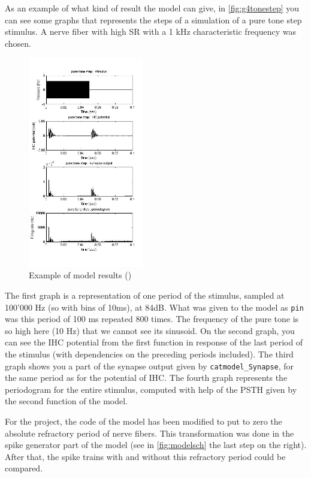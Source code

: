 As an example of what kind of result the model can give,
in \autoref{fig:g4tonestep} you can see some graphs that represents the steps of a 
simulation of a pure tone step stimulus.
A nerve fiber with high SR with a 1 kHz characteristic frequency 
was chosen.


\begin{figure}[h]
	\centering
	\includegraphics[width=0.45\textwidth]{images/g4-tonestep-column2.jpg}
	\caption{Example of model results (\cite{Model1})}
	\label{fig:g4tonestep}
\end{figure}


The first graph is a representation of one period of the stimulus, 
sampled at 100'000 Hz (so with bins of 10ms), at 84dB.
What was given to the model as \texttt{pin} was this period of 100 ms repeated 800
times. The frequency of the pure tone is so high here (10 Hz) that we cannot see its sinusoid.
On the second graph, you can see the IHC potential from the first function
in response of the last period of the stimulus 
(with dependencies on the preceding periods included).
The third graph shows you a part of the synapse output given by \texttt{catmodel\_Synapse}, 
for the same period as for the potential of IHC.
The fourth graph represents the periodogram for the entire stimulus, 
computed with help of the PSTH given by the second function of the model.

For the project, the code of the model has been modified to put to zero 
the absolute refractory period of nerve fibers. 
This transformation was done in the spike generator 
part of the model (see in \autoref{fig:modelsch} the last step on the right).
After that, the spike trains with and without this refractory period could be compared.

